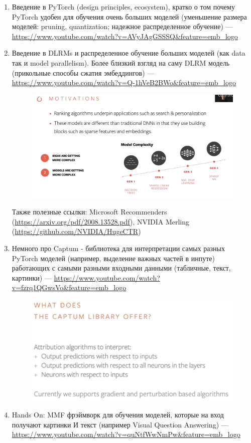 \begin{enumerate}
    \item Введение в PyTorch (design principles, ecosystem), кратко о том почему PyTorch удобен для обучения очень больших моделей (уменьшение размера моделей: pruning, quantization; надежное распределенное обучение) --- \url{https://www.youtube.com/watch?v=AVyJAgGSSSQ&feature=emb_logo} 
    \item Введение в DLRMs и распределенное обучение больших моделей (как data так и model parallelism). Более близкий взгляд на саму DLRM модель (прикольные способы сжатия эмбеддингов) --- \url{https://www.youtube.com/watch?v=Q-1hVeB2BWo&feature=emb_logo}
        \begin{figure}[ht]
            \centering
            \includegraphics[width=0.8\linewidth]{parts/recsys/images/dlrm.png}
        \end{figure}
        
        Также полезные ссылки: Microsoft Recommenders (\url{https://arxiv.org/pdf/2008.13528.pdf}), NVIDIA Merling (\url{https://github.com/NVIDIA/HugeCTR})
    \item Немного про Captum - библиотека для интерпретации самых разных PyTorch моделей (например, выделение важных частей в инпуте) работающих с самыми разными входными данными (табличные, текст, картинки) --- \url{https://www.youtube.com/watch?v=fzrq1QGwsVo&feature=emb_logo}
        \begin{figure}[ht]
            \centering
            \includegraphics[width=0.5\linewidth]{parts/recsys/images/captum.png}
        \end{figure}
    \item Hands On: MMF фрэймворк для обучения моделей, которые на вход получают картинки И текст (например Visual Question Answering) --- \url{https://www.youtube.com/watch?v=quNtfWwNmPw&feature=emb_logo}
\end{enumerate}

